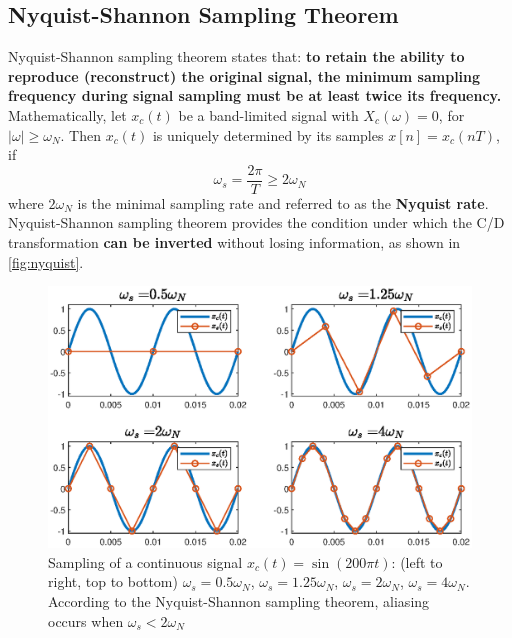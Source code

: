 \subsection{Nyquist-Shannon Sampling Theorem}
Nyquist-Shannon sampling theorem states that: \textbf{to retain the ability to reproduce (reconstruct) the original signal, the minimum sampling frequency during signal sampling must be at least twice its frequency.}\\

Mathematically, let $x_{c}(t)$ be a band-limited signal with $X_{c}(\omega)=0$, for $\lvert \omega \rvert \geq \omega_{N}$. Then $x_{c}(t)$ is uniquely determined by its samples $x[n] = x_{c}(nT)$, if 
\[ \omega_{s}=\frac{2\pi}{T} \geq 2\omega_{N} \]
where $2\omega_{N}$ is the minimal sampling rate and referred to as the \textbf{Nyquist rate}.\\

Nyquist-Shannon sampling theorem provides the condition under which the C/D transformation \textbf{can be inverted} without losing information, as shown in \autoref{fig:nyquist}.

\begin{figure}[H]
    \centering
    \includegraphics[width=\textwidth, center]{images/nyquist.eps}
    \caption{Sampling of a continuous signal $x_{c}(t)=\sin(200\pi t)$: (left to right, top to bottom) $\omega_{s}=0.5\omega_{N}$, $\omega_{s}=1.25\omega_{N}$, $\omega_{s}=2\omega_{N}$, $\omega_{s}=4\omega_{N}$. According to the Nyquist-Shannon sampling theorem, aliasing occurs when $\omega_{s} < 2\omega_{N}$}
    \label{fig:nyquist}
\end{figure}